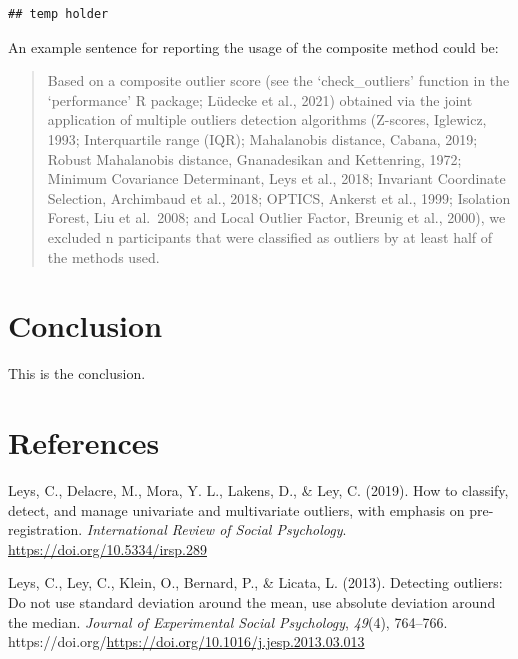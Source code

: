 \documentclass[
]{article}
\newlength{\cslhangindent}
\newlength{\cslentryspacingunit} %
\newenvironment{CSLReferences}[2] %
 {%
  \setlength{\parindent}{0pt}
  \ifodd #1
  \let\oldpar\par
  \def\par{\hangindent=\cslhangindent\oldpar}
  \fi
  \setlength{\parskip}{#2\cslentryspacingunit}
 }%
 {}
\begin{document}
\begin{verbatim}
## temp holder
\end{verbatim}

An example sentence for reporting the usage of the composite method
could be:

\begin{quote}
Based on a composite outlier score (see the `check\_outliers' function
in the `performance' R package; Lüdecke et al., 2021) obtained via the
joint application of multiple outliers detection algorithms (Z-scores,
Iglewicz, 1993; Interquartile range (IQR); Mahalanobis distance, Cabana,
2019; Robust Mahalanobis distance, Gnanadesikan and Kettenring, 1972;
Minimum Covariance Determinant, Leys et al., 2018; Invariant Coordinate
Selection, Archimbaud et al., 2018; OPTICS, Ankerst et al., 1999;
Isolation Forest, Liu et al.~2008; and Local Outlier Factor, Breunig et
al., 2000), we excluded n participants that were classified as outliers
by at least half of the methods used.
\end{quote}

\hypertarget{conclusion}{%
\section{Conclusion}\label{conclusion}}

This is the conclusion.

\hypertarget{references}{%
\section*{References}\label{references}}

\hypertarget{refs}{}
\begin{CSLReferences}{1}{0}
\leavevmode{}%
Leys, C., Delacre, M., Mora, Y. L., Lakens, D., \& Ley, C. (2019). How
to classify, detect, and manage univariate and multivariate outliers,
with emphasis on pre-registration. \emph{International Review of Social
Psychology}. \url{https://doi.org/10.5334/irsp.289}

\leavevmode{}%
Leys, C., Ley, C., Klein, O., Bernard, P., \& Licata, L. (2013).
Detecting outliers: Do not use standard deviation around the mean, use
absolute deviation around the median. \emph{Journal of Experimental
Social Psychology}, \emph{49}(4), 764--766.
https://doi.org/\url{https://doi.org/10.1016/j.jesp.2013.03.013}

\end{CSLReferences}
\end{document}
